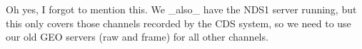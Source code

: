  
Oh yes, I forgot to mention this. We _also_ have the NDS1 server running, but 
this only covers those channels recorded by the CDS system, so we need to use our old GEO servers (raw and frame) for all other channels.

